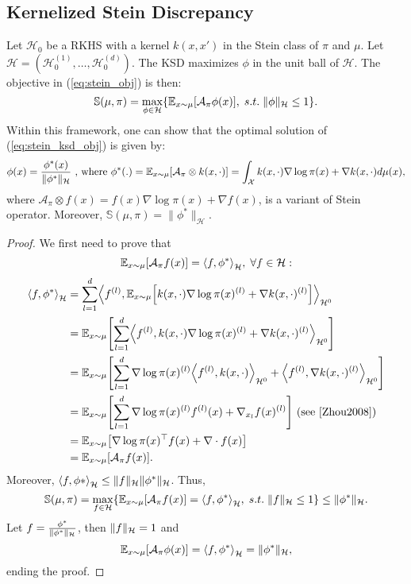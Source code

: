 \documentclass[runningheads,a4paper]{llncs}
\newcommand{\E}{\mathbb{E}}
\newcommand{\Sr}{\mathbb{S}}
\newcommand{\X}{\mathcal{X}}
\newcommand{\A}{\mathcal{A}}
\newcommand{\Hr}{\mathcal{H}}
\DeclarePairedDelimiter{\norm}{\|}{\|}
\DeclarePairedDelimiter{\bra}{\{}{\}}
\DeclarePairedDelimiter{\sq}{[}{]}
\DeclarePairedDelimiter{\sca}{\langle}{\rangle}
\begin{document}
\subsection{Kernelized Stein Discrepancy}\label{sec:ksd}
Let $\Hr_0$ be a RKHS with a kernel $k(x, x')$ in the Stein class of $\pi$ and $\mu$.
Let $\Hr = (\Hr^{(1)}_0, \dots, \Hr^{(d)}_0)$. The KSD maximizes $\phi$ in the unit ball of $\Hr$.
The objective in (\ref{eq:stein_obj}) is then:
\begin{equation}
  \Sr(\mu, \pi) =
    \max_{\phi \in \Hr} \bra*{ \E_{x \sim \mu}[\A_\pi \phi (x)], \; s.t. \; \|\phi\|_{\Hr} \leq 1 }.
  \label{eq:stein_ksd_obj}
\end{equation}
Within this framework, one can show that the optimal solution of (\ref{eq:stein_ksd_obj})
is given by:
\begin{equation}
  \phi(x) = \frac{\phi^*(x)}{\|\phi^*\|_{\Hr}}
    \text{ , where } \phi^*(.) = \E_{x \sim \mu}\sq*{ \A_\pi \otimes k(x, \cdot) }
                               = \int_\X k(x, \cdot) \nabla \log \pi(x) + \nabla k(x, \cdot) d\mu(x),
  \label{eq:stein_ksd_sol}        
\end{equation}
where $\A_\pi \otimes f(x) = f(x) \nabla \log \pi(x) + \nabla f(x)$, is a variant of Stein operator.
Moreover, $\Sr(\mu, \pi) = \|\phi^*\|_\Hr$.
\begin{proof}
  We first need to prove that
  $$
  \E_{x \sim \mu} \sq*{ \A_\pi f(x) } = \sca*{f, \phi^*}_\Hr, \; \forall f \in \Hr:
  $$
  \begin{equation}
    \begin{split}
      \sca*{f, \phi^*}_\Hr &= \sum_{l=1}^d \sca*{ f^{(l)},
        \E_{x \sim \mu}\sq*{ k(x, \cdot) \nabla \log \pi(x)^{(l)} + \nabla k(x, \cdot)^{(l)}} }_{\Hr^0} \\
        &= \E_{x \sim \mu}\sq*{ \sum_{l=1}^d \sca*{f^{(l)}, k(x, \cdot)
          \nabla \log \pi(x)^{(l)} + \nabla k(x, \cdot)^{(l)} }_{\Hr^0} } \\
        &= \E_{x \sim \mu}\sq*{ \sum_{l=1}^d \nabla \log \pi(x)^{(l)}
          \sca*{ f^{(l)}, k(x, \cdot) }_{\Hr^0} + \sca*{ f^{(l)}, \nabla k(x, \cdot)^{(l)} }_{\Hr^0} } \\
        &= \E_{x \sim \mu}\sq*{ \sum_{l=1}^d \nabla \log \pi(x)^{(l)} f^{(l)}(x) + \nabla_{x_l} f(x)^{(l)} }
         \text{ (see \cite{Zhou2008}) } \\
        &= \E_{x \sim \mu}\sq*{ \nabla \log \pi(x)^\top f(x) + \nabla \cdot f(x) } \\
        &= \E_{x \sim \mu} \sq*{ \A_\pi f(x) }.
    \end{split}
  \end{equation}
  Moreover, $\sca*{ f, \phi* }_\Hr \leq \norm{f}_\Hr \norm{\phi^*}_\Hr$.
  Thus,
  $$
  \Sr(\mu, \pi) =
    \max_{f \in \Hr} \bra*{ \E_{x \sim \mu}[\A_\pi f (x)] = \sca*{f, \phi^*}_\Hr, \; s.t. \; \|f\|_{\Hr} \leq 1 }
    \leq \norm{\phi^*}_\Hr.
  $$
  Let $f = \frac{\phi^*}{\norm{\phi^*}_\Hr}$, then $\norm{f}_\Hr = 1$ and
  $$
  \E_{x \sim \mu}[\A_\pi \phi (x)] = \sca*{f, \phi^*}_\Hr = \norm{\phi^*}_\Hr,
  $$
  ending the proof.
\end{proof}
\end{document}
